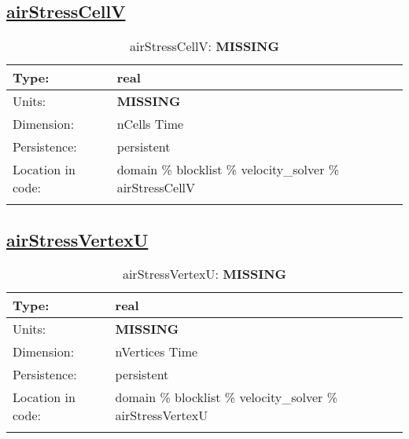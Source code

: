 \subsection[airStressCellV]{\hyperref[sec:var_tab_velocity_solver]{airStressCellV}}
\label{subsec:var_sec_velocity_solver_airStressCellV}
\begin{center}
\begin{longtable}{| p{2.0in} | p{4.0in} |}
        \hline 
        Type: & real \\
        \hline 
        Units: & {\bf \color{red} MISSING} \\
        \hline 
        Dimension: & nCells Time \\
        \hline 
        Persistence: & persistent \\
        \hline 
         Location in code: & domain \% blocklist \% velocity\_solver \% airStressCellV \\
         \hline 
    \caption{airStressCellV: {\bf \color{red} MISSING}}
\end{longtable}
\end{center}
\subsection[airStressVertexU]{\hyperref[sec:var_tab_velocity_solver]{airStressVertexU}}
\label{subsec:var_sec_velocity_solver_airStressVertexU}
\begin{center}
\begin{longtable}{| p{2.0in} | p{4.0in} |}
        \hline 
        Type: & real \\
        \hline 
        Units: & {\bf \color{red} MISSING} \\
        \hline 
        Dimension: & nVertices Time \\
        \hline 
        Persistence: & persistent \\
        \hline 
         Location in code: & domain \% blocklist \% velocity\_solver \% airStressVertexU \\
         \hline 
    \caption{airStressVertexU: {\bf \color{red} MISSING}}
\end{longtable}
\end{center}
